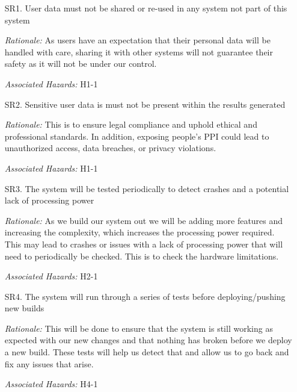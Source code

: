 \documentclass{article}
\begin{document}
\begin{enumerate}

    \item[SR1.] User data must not be shared or re-used in any system not part of this system\\
    \item[] \emph{Rationale:}  As users have an expectation that their personal data will be handled with care, sharing it with other systems will not guarantee their safety as it will not be under our control.\\
    \item[] \emph{Associated Hazards:} H1-1\\

    \item[SR2.] Sensitive user data is must not be present within the results generated\\
    \item[] \emph{Rationale:}  This is to ensure legal compliance and uphold ethical and professional standards. In addition, exposing people's PPI could lead to unauthorized access, data breaches, or privacy violations.\\
    \item[] \emph{Associated Hazards:} H1-1\\
    
    \item[SR3.] The system will be tested periodically to detect crashes and a potential lack of processing power\\
    \item[] \emph{Rationale:} As we build our system out we will be adding more features and increasing the complexity, which increases the processing power required. This may lead to crashes or issues with a lack of processing power that will need to periodically be checked. This is to check the hardware limitations. \\
    \item[] \emph{Associated Hazards:} H2-1\\

    \item[SR4.] The system will run through a series of tests before deploying/pushing new builds\\
    \item[] \emph{Rationale:} This will be done to ensure that the system is still working as expected with our new changes and that nothing has broken before we deploy a new build. These tests will help us detect that and allow us to go back and fix any issues that arise. \\
    \item[] \emph{Associated Hazards:} H4-1  \\


\end{enumerate}
\end{document}
